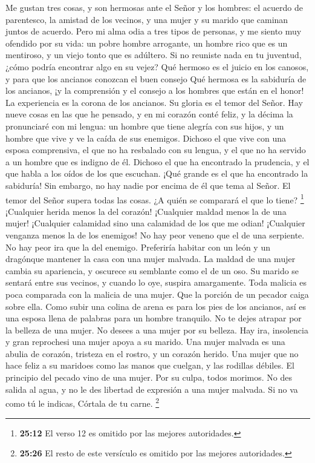  Me gustan tres cosas, y son hermosas ante el Señor y los
hombres: el acuerdo de parentesco, la amistad de los vecinos, y una
mujer y su marido que caminan juntos de acuerdo.  Pero mi
alma odia a tres tipos de personas, y me siento muy ofendido por su
vida: un pobre hombre arrogante, un hombre rico que es un mentiroso, y
un viejo tonto que es adúltero.  Si no reuniste nada en tu
juventud, ¿cómo podría encontrar algo en su vejez?  Qué
hermoso es el juicio en los canosos, y para que los ancianos conozcan el
buen consejo  Qué hermosa es la sabiduría de los ancianos,
¡y la comprensión y el consejo a los hombres que están en el honor!
 La experiencia es la corona de los ancianos. Su gloria es
el temor del Señor.  Hay nueve cosas en las que he
pensado, y en mi corazón conté feliz, y la décima la pronunciaré con mi
lengua: un hombre que tiene alegría con sus hijos, y un hombre que vive
y ve la caída de sus enemigos.  Dichoso el que vive con
una esposa comprensiva, el que no ha resbalado con su lengua, y el que
no ha servido a un hombre que es indigno de él.  Dichoso
el que ha encontrado la prudencia, y el que habla a los oídos de los que
escuchan.  ¡Qué grande es el que ha encontrado la
sabiduría! Sin embargo, no hay nadie por encima de él que tema al Señor.
 El temor del Señor supera todas las cosas. ¿A quién se
comparará el que lo tiene?  \footnote{\textbf{25:12} El
  verso 12 es omitido por las mejores autoridades.} 
¡Cualquier herida menos la del corazón! ¡Cualquier maldad menos la de
una mujer!  ¡Cualquier calamidad sino una calamidad de
los que me odian! ¡Cualquier venganza menos la de los enemigos!
 No hay peor veneno que el de una serpiente. No hay peor
ira que la del enemigo.  Preferiría habitar con un león y
un dragónque mantener la casa con una mujer malvada.  La
maldad de una mujer cambia su apariencia, y oscurece su semblante como
el de un oso.  Su marido se sentará entre sus vecinos, y
cuando lo oye, suspira amargamente.  Toda malicia es poca
comparada con la malicia de una mujer. Que la porción de un pecador
caiga sobre ella.  Como subir una colina de arena es para
los pies de los ancianos, así es una esposa llena de palabras para un
hombre tranquilo.  No te dejes atrapar por la belleza de
una mujer. No desees a una mujer por su belleza.  Hay
ira, insolencia y gran reprochesi una mujer apoya a su marido.
 Una mujer malvada es una abulia de corazón, tristeza en
el rostro, y un corazón herido. Una mujer que no hace feliz a su
maridoes como las manos que cuelgan, y las rodillas débiles.
 El principio del pecado vino de una mujer. Por su culpa,
todos morimos.  No des salida al agua, y no le des
libertad de expresión a una mujer malvada.  Si no va como
tú le indicas, Córtala de tu carne. \footnote{\textbf{25:26} El resto de
  este versículo es omitido por las mejores autoridades.}

